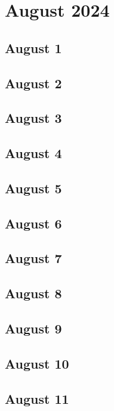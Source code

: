 %
%
%

\chapter{August 2024}
\label{intro} %

\section{August 1}

\section{August 2}

\section{August 3}

\section{August 4}

\section{August 5}

\section{August 6}

\section{August 7}

\section{August 8}

\section{August 9}

\section{August 10}

\section{August 11}

